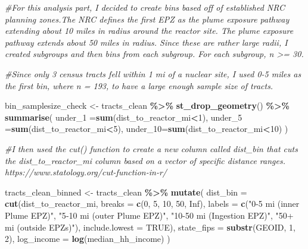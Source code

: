 \documentclass[
]{article}
\newenvironment{Shaded}{\begin{snugshade}}{\end{snugshade}}
\newcommand{\AttributeTok}[1]{\textcolor[rgb]{0.13,0.29,0.53}{#1}}
\newcommand{\CommentTok}[1]{\textcolor[rgb]{0.56,0.35,0.01}{\textit{#1}}}
\newcommand{\ConstantTok}[1]{\textcolor[rgb]{0.56,0.35,0.01}{#1}}
\newcommand{\DecValTok}[1]{\textcolor[rgb]{0.00,0.00,0.81}{#1}}
\newcommand{\FunctionTok}[1]{\textcolor[rgb]{0.13,0.29,0.53}{\textbf{#1}}}
\newcommand{\NormalTok}[1]{#1}
\newcommand{\OtherTok}[1]{\textcolor[rgb]{0.56,0.35,0.01}{#1}}
\newcommand{\SpecialCharTok}[1]{\textcolor[rgb]{0.81,0.36,0.00}{\textbf{#1}}}
\newcommand{\StringTok}[1]{\textcolor[rgb]{0.31,0.60,0.02}{#1}}
\begin{document}
\begin{Shaded}
\begin{Highlighting}[]
\CommentTok{\#For this analysis part, I decided to create bins based off of established NRC planning zones.The NRC defines the first EPZ as the plume exposure pathway extending about 10 miles in radius around the reactor site. The plume exposure pathway extends about 50 miles in radius. Since these are rather large radii, I created subgroups and then bins from each subgroup. For each subgroup, n \textgreater{}= 30. }

\CommentTok{\#Since only 3 census tracts fell within 1 mi of a nuclear site, I used 0{-}5 miles as the first bin, where n = 193, to have a large enough sample size of tracts. }

\NormalTok{bin\_samplesize\_check }\OtherTok{\textless{}{-}}\NormalTok{ tracts\_clean }\SpecialCharTok{\%\textgreater{}\%}
  \FunctionTok{st\_drop\_geometry}\NormalTok{() }\SpecialCharTok{\%\textgreater{}\%} 
  \FunctionTok{summarise}\NormalTok{(}
    \AttributeTok{under\_1 =}\FunctionTok{sum}\NormalTok{(dist\_to\_reactor\_mi}\SpecialCharTok{\textless{}}\DecValTok{1}\NormalTok{), }
    \AttributeTok{under\_5 =}\FunctionTok{sum}\NormalTok{(dist\_to\_reactor\_mi}\SpecialCharTok{\textless{}}\DecValTok{5}\NormalTok{), }
    \AttributeTok{under\_10=}\FunctionTok{sum}\NormalTok{(dist\_to\_reactor\_mi}\SpecialCharTok{\textless{}}\DecValTok{10}\NormalTok{)}
\NormalTok{  )}

\CommentTok{\#I then used the cut() function to create a new column called dist\_bin that cuts the dist\_to\_reactor\_mi column based on a vector of specific distance ranges. https://www.statology.org/cut{-}function{-}in{-}r/}

\NormalTok{tracts\_clean\_binned }\OtherTok{\textless{}{-}}\NormalTok{ tracts\_clean }\SpecialCharTok{\%\textgreater{}\%}
  \FunctionTok{mutate}\NormalTok{(}
    \AttributeTok{dist\_bin =} \FunctionTok{cut}\NormalTok{(dist\_to\_reactor\_mi,}
                   \AttributeTok{breaks =} \FunctionTok{c}\NormalTok{(}\DecValTok{0}\NormalTok{, }\DecValTok{5}\NormalTok{, }\DecValTok{10}\NormalTok{, }\DecValTok{50}\NormalTok{, }\ConstantTok{Inf}\NormalTok{),}
                   \AttributeTok{labels =} \FunctionTok{c}\NormalTok{(}\StringTok{"0{-}5 mi (inner Plume EPZ)"}\NormalTok{,}
                              \StringTok{"5{-}10 mi (outer Plume EPZ)"}\NormalTok{,}
                              \StringTok{"10{-}50 mi (Ingestion EPZ)"}\NormalTok{,}
                              \StringTok{"50+ mi (outside EPZs)"}\NormalTok{),}
                   \AttributeTok{include.lowest =} \ConstantTok{TRUE}\NormalTok{),}
    \AttributeTok{state\_fips =} \FunctionTok{substr}\NormalTok{(GEOID, }\DecValTok{1}\NormalTok{, }\DecValTok{2}\NormalTok{),}
    \AttributeTok{log\_income =} \FunctionTok{log}\NormalTok{(median\_hh\_income)}
\NormalTok{  )}


\end{Highlighting}
\end{Shaded}
\end{document}
